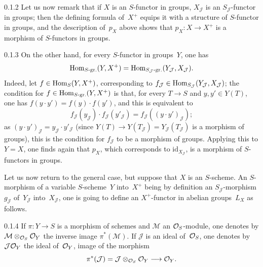 \begin{remark}{0.1.2}
\label{III.0.1.2}
Let us now remark that if \(X\) is an \(S\)-functor in groups,
\(X_{\mathcal{J}}\) is an \(S_{\mathcal{J}}\)-functor in groups; then
the defining formula of~\(X^{+}\) equips it with a structure of
\(S\)-functor in groups, and the description of~\(p_X\) above shows that
\(p_X\colon X\to X^{+}\) is a morphism of \(S\)-functors in groups.
\end{remark}

\begin{remark}{0.1.3}
\label{III.0.1.3}
On the other hand, for every \(S\)-functor in groups~\(Y\), one has
\[
\operatorname{Hom}_{S\text{-gr.}}(Y,X^{+})
=\operatorname{Hom}_{S_{\mathcal{J}}\text{-gr.}}(Y_{\mathcal{J}},X_{\mathcal{J}}).
\]
Indeed, let \(f\in\operatorname{Hom}_S(Y,X^{+})\), corresponding to
\(f_{\mathcal{J}}\in\operatorname{Hom}_{S_{\mathcal{J}}}(Y_{\mathcal{J}},X_{\mathcal{J}})\);
the condition for \(f\in\operatorname{Hom}_{S\text{-gr.}}(Y,X^{+})\) is that, for every
\(T\to S\) and \(y,y'\in Y(T)\), one has
\(f(y\cdot y')=f(y)\cdot f(y')\), and this is equivalent to
\[
f_{\mathcal{J}}(y_{\mathcal{J}})\cdot f_{\mathcal{J}}(y'_{\mathcal{J}})
=f_{\mathcal{J}}((y\cdot y')_{\mathcal{J}});
\]
as \((y\cdot y')_{\mathcal{J}}=y_{\mathcal{J}}\cdot y'_{\mathcal{J}}\)
(since \(Y(T)\to Y(T_{\mathcal{J}})=Y_{\mathcal{J}}(T_{\mathcal{J}})\) is
a morphism of groups), this is the condition for \(f_{\mathcal{J}}\) to
be a morphism of groups. Applying this to \(Y=X\), one finds again that
\(p_X\), which corresponds to \(\mathrm{id}_{X_{\mathcal{J}}}\), is a
morphism of \(S\)-functors in groups.
\end{remark}

Let us now return to the general case, but suppose that \(X\) is an
\(S\)-scheme. An \(S\)-morphism of a variable \(S\)-scheme~\(Y\)
into~\(X^{+}\) being by definition an \(S_{\mathcal{J}}\)-morphism
\(g_{\mathcal{J}}\) of~\(Y_{\mathcal{J}}\) into~\(X_{\mathcal{J}}\), one
is going to define an \(X^{+}\)-functor in abelian groups~\(L_X\) as
follows.

\begin{scholium}{0.1.4}
\label{III.0.1.4}
{\renewcommand{\thefootnote}{(7)}}%
If \(\pi\colon Y\to S\) is a morphism of schemes and \(\mathcal{M}\) an
\(\mathcal{O}_S\)-module, one denotes by \(\mathcal{M}\otimes_{\mathcal{O}_S}\mathcal{O}_Y\) the
inverse image \(\pi^{*}(\mathcal{M})\). If \(\mathcal{J}\) is an ideal
of~\(\mathcal{O}_S\), one denotes by \(\mathcal{J}\mathcal{O}_Y\) the ideal of~\(\mathcal{O}_Y\), image
of the morphism
\[
\pi^{*}(\mathcal{J})=\mathcal{J}\otimes_{\mathcal{O}_S}\mathcal{O}_Y\longrightarrow\mathcal{O}_Y.
\]
\end{scholium}


